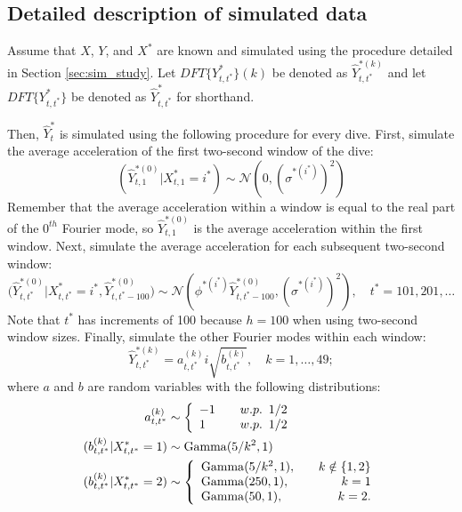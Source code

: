 
\subsection{Detailed description of simulated data}

Assume that $X$, $Y$, and $X^*$ are known and simulated using the procedure detailed in Section \ref{sec:sim_study}. Let $DFT\{Y^*_{t,t^*}\}(k)$ be denoted as $\hat{Y}^{*(k)}_{t,t^*}$ and let $DFT\{Y^*_{t,t^*}\}$ be denoted as $\hat{Y}^*_{t,t^*}$ for shorthand. 

Then, $\hat{Y}^*_{t}$ is simulated using the following procedure for every dive. First, simulate the average acceleration of the first two-second window of the dive:
$$
	(\hat{Y}^{*(0)}_{t,1}|X^*_{t,1} = i^*) \sim \mathcal{N} \left(0, \left(\sigma^{*(i^*)}\right)^2 \right)
$$
Remember that the average acceleration within a window is equal to the real part of the $0^{th}$ Fourier mode, so $\hat{Y}^{*(0)}_{t,1}$ is the average acceleration within the first window. Next, simulate the average acceleration for each subsequent two-second window:
\begin{equation}
	\Big(\hat{Y}^{*(0)}_{t,t^*}|X^*_{t,t^*} = i^*,\hat{Y}^{*(0)}_{t,t^*-100}\Big) \sim \mathcal{N} \left(\phi^{*(i^*)} \hat{Y}^{*(0)}_{t,t^*-100}, \left(\sigma^{*(i^*)}\right)^2 \right), \quad t^* = 101,201,\ldots
	\label{eqn:yhat_0}
\end{equation}
Note that $t^*$ has increments of 100 because $h=100$ when using two-second window sizes. Finally, simulate the other Fourier modes within each window:
$$
	\hat{Y}^{*(k)}_{t,t^*} = a_{t,t^*}^{(k)} i\sqrt{b^{(k)}_{t,t^*}}, \quad k = 1,\ldots,49;
$$
where $a$ and $b$ are random variables with the following distributions:
\begin{align*}
    a_{t,t^*}^{(k)} &\sim  \left\{\begin{array}{lr}
	-1 & \quad w.p. \enspace 1/2 \\
	1  & \quad w.p. \enspace 1/2
	\end{array}\right. \\
	(b^{(k)}_{t,t^*}|X^*_{t,t^*}  = 1) &\sim {\rm{Gamma}}(5/k^2, 1) \\
	(b^{(k)}_{t,t^*}|X^*_{t,t^*} = 2) &\sim \left\{\begin{array}{lr}
	{\rm{Gamma}}(5/k^2, 1), \quad & k \notin \{1,2\} \\
	{\rm{Gamma}}(250,1), & k = 1 \\
	{\rm{Gamma}}(50,1), & k = 2.
	\end{array}\right. 
\end{align*}
